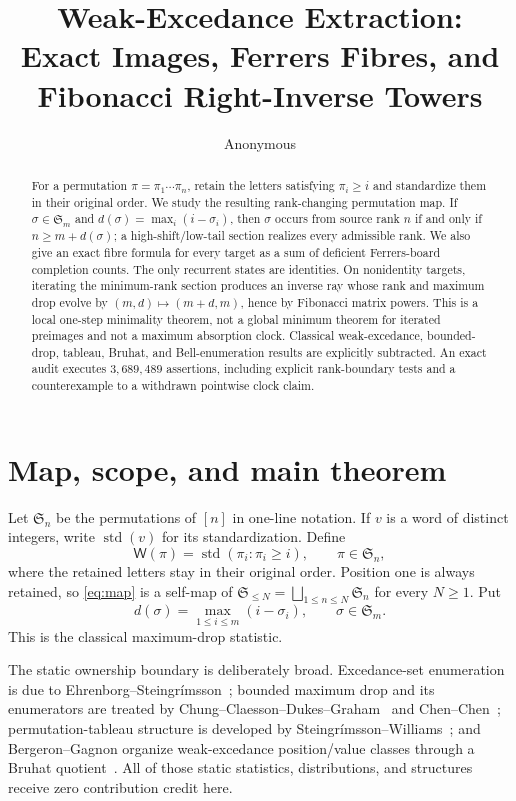 \documentclass[a4paper,10pt]{amsart}
\title[Weak-excedance extraction]{Weak-Excedance Extraction:\\
Exact Images, Ferrers Fibres, and Fibonacci Right-Inverse Towers}
\author{Anonymous}
\date{}
\theoremstyle{remark}
\newcommand{\Sym}{\mathfrak S}
\newcommand{\std}{\operatorname{std}}
\newcommand{\WEX}{\mathsf W}
\begin{document}
\begin{abstract}
For a permutation $\pi=\pi_1\cdots\pi_n$, retain the letters satisfying
$\pi_i\ge i$ and standardize them in their original order.  We study the
resulting rank-changing permutation map.  If $\sigma\in\mathfrak S_m$ and
$d(\sigma)=\max_i(i-\sigma_i)$, then $\sigma$ occurs from source rank $n$ if
and only if $n\ge m+d(\sigma)$; a high-shift/low-tail section realizes every
admissible rank.  We also give an exact fibre formula for every target as a
sum of deficient Ferrers-board completion counts.  The only recurrent states
are identities.  On nonidentity targets, iterating the minimum-rank section
produces an inverse ray whose rank and maximum drop evolve by
$(m,d)\mapsto(m+d,m)$, hence by Fibonacci matrix powers.  This is a local
one-step minimality theorem, not a global minimum theorem for iterated
preimages and not a maximum absorption clock.  Classical weak-excedance,
bounded-drop, tableau, Bruhat, and Bell-enumeration results are explicitly
subtracted.  An exact audit executes $3{,}689{,}489$ assertions, including
explicit rank-boundary tests and a counterexample to a withdrawn pointwise
clock claim.
\end{abstract}

\maketitle

\section{Map, scope, and main theorem}\label{sec:setup}

Let $\Sym_n$ be the permutations of $[n]$ in one-line notation.  If $v$ is a
word of distinct integers, write $\std(v)$ for its standardization.  Define
\begin{equation}\label{eq:map}
 \WEX(\pi)=\std(\pi_i:\pi_i\ge i),
 \qquad \pi\in\Sym_n,
\end{equation}
where the retained letters stay in their original order.  Position one is
always retained, so \eqref{eq:map} is a self-map of
$\Sym_{\le N}=\bigsqcup_{1\le n\le N}\Sym_n$ for every \(N\ge1\).  Put
\begin{equation}\label{eq:drop}
 d(\sigma)=\max_{1\le i\le m}(i-\sigma_i),
 \qquad \sigma\in\Sym_m.
\end{equation}
This is the classical maximum-drop statistic.

The static ownership boundary is deliberately broad.  Excedance-set
enumeration is due to Ehrenborg--Steingr{\'{i}}msson~\cite{EhrenborgSteingrimsson2000};
bounded maximum drop and its enumerators are treated by
Chung--Claesson--Dukes--Graham~\cite{ChungClaessonDukesGraham2010} and
Chen--Chen~\cite{ChenChen2016}; permutation-tableau structure is developed by
Steingr{\'{i}}msson--Williams~\cite{SteingrimssonWilliams2005}; and
Bergeron--Gagnon organize weak-excedance position/value classes through a
Bruhat quotient~\cite{BergeronGagnon2023}.  All of those static statistics,
distributions, and structures receive zero contribution credit here.
\end{document}
